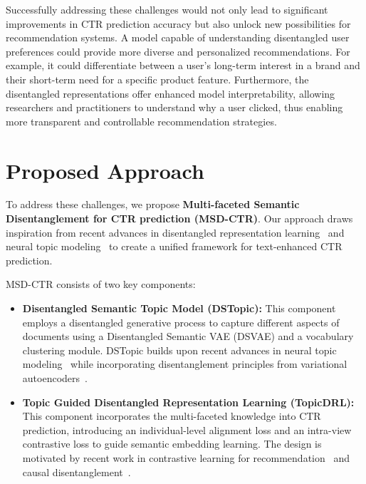 Successfully addressing these challenges would not only lead to significant improvements in CTR prediction accuracy but also unlock new possibilities for recommendation systems. A model capable of understanding disentangled user preferences could provide more diverse and personalized recommendations. For example, it could differentiate between a user's long-term interest in a brand and their short-term need for a specific product feature. Furthermore, the disentangled representations offer enhanced model interpretability, allowing researchers and practitioners to understand why a user clicked, thus enabling more transparent and controllable recommendation strategies.

\section{Proposed Approach}

To address these challenges, we propose \textbf{Multi-faceted Semantic Disentanglement for CTR prediction (MSD-CTR)}. Our approach draws inspiration from recent advances in disentangled representation learning~\cite{higgins2017beta, burgess2018understanding} and neural topic modeling~\cite{dieng2020topic, srivastava2017autoencoding} to create a unified framework for text-enhanced CTR prediction.

MSD-CTR consists of two key components: 

\begin{itemize}
    \item \textbf{Disentangled Semantic Topic Model (DSTopic):} This component employs a disentangled generative process to capture different aspects of documents using a Disentangled Semantic VAE (DSVAE) and a vocabulary clustering module. DSTopic builds upon recent advances in neural topic modeling~\cite{dieng2020topic, wu2023effective} while incorporating disentanglement principles from variational autoencoders~\cite{kingma2013auto, higgins2017beta}.
    
    \item \textbf{Topic Guided Disentangled Representation Learning (TopicDRL):} This component incorporates the multi-faceted knowledge into CTR prediction, introducing an individual-level alignment loss and an intra-view contrastive loss to guide semantic embedding learning. The design is motivated by recent work in contrastive learning for recommendation~\cite{lin2022feature} and causal disentanglement~\cite{yang2021causalvae, zheng2021disentangling}.
\end{itemize}

